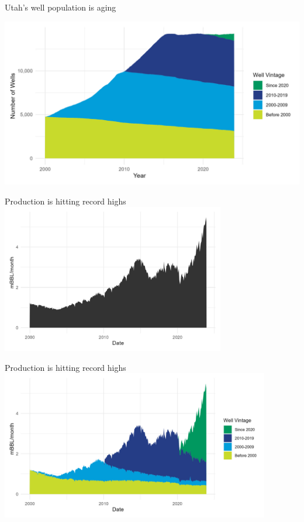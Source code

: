 \documentclass{beamer}
\begin{document}
\begin{frame}{Utah's well population is aging}

\includegraphics[width=\textwidth]{Figures/N_wells_vinage.jpg}
    
\end{frame}

\begin{frame}{Production is hitting record highs}
    \includegraphics[height=6.5cm]{Figures/OilProduction.jpg}
\end{frame}

\begin{frame}{Production is hitting record highs}
    \includegraphics[height=6.5cm]{Figures/OilProduction_vintage.jpg}
\end{frame}
\end{document}
